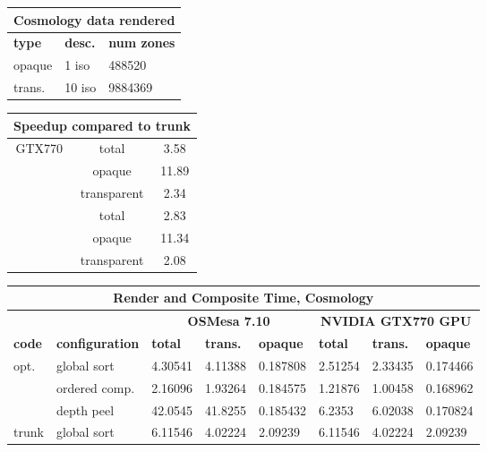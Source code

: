 \documentclass[a4paper,10pt]{report}
\begin{document}
\begin{figure}
\begin{minipage}{1.0\textwidth}
\begin{center}
\vspace{0.05in}
{\footnotesize
\def\arraystretch{1.25}
\begin{tabular}{|l|l|l|}
\hline
\multicolumn{3}{|c|}{\bf{Cosmology data rendered}} \\ \hline
{\bf type} & {\bf desc.} & {\bf num zones} \\ \hline
opaque & 1 iso & 488520 \\ \hline
trans. & 10 iso & 9884369 \\ \hline
\end{tabular}} \vspace{0.05in}
\def\arraystretch{1.25}
{\footnotesize
\begin{tabular}{|c|c|c|}
\hline
\multicolumn{3}{|c|}{\bf{Speedup compared to trunk}} \\ \hline
\multirow{4}{*}{GTX770} & total & 3.58 \\ \cline{2-3}
 & opaque & 11.89 \\ \cline{2-3}
 & transparent & 2.34 \\ \hline
\multirow{3}{*}{OSMesa} & total & 2.83 \\ \cline{2-3}
 & opaque & 11.34 \\ \cline{2-3}
 & transparent & 2.08 \\ \hline
\end{tabular}}
\end{center}
\end{minipage}

\begin{minipage}{1.0\textwidth}
\begin{center}
{\footnotesize
\def\arraystretch{1.25}
\begin{tabular}{|l|l|l|l|l|l|l|l|}
\hline
\multicolumn{8}{|c|}{\bf Render and Composite Time, Cosmology} \\ \hline
\multicolumn{2}{|c|}{}& \multicolumn{3}{|c|}{\bf OSMesa 7.10 } & \multicolumn{3}{|c|}{\bf NVIDIA GTX770 GPU} \\ \hline
{\bf code} & {\bf configuration} & {\bf total} & {\bf trans.} & {\bf opaque} & {\bf total} & {\bf trans.} & {\bf opaque} \\ \hline
\multirow{3}{*}{opt.} & global sort &  4.30541 & 4.11388 & 0.187808 & 2.51254 & 2.33435 & 0.174466 \\ \cline{2-8}
 & ordered comp. & 2.16096 & 1.93264 & 0.184575 & 1.21876 & 1.00458 & 0.168962 \\ \cline{2-8}
 & depth peel & 42.0545 & 41.8255 & 0.185432 & 6.2353 & 6.02038 & 0.170824 \\ \hline
trunk & global sort &  6.11546 & 4.02224 & 2.09239 & 6.11546 & 4.02224 & 2.09239 \\ \hline
\end{tabular}}
\end{center}
\end{minipage}


\end{figure}
\end{document}
